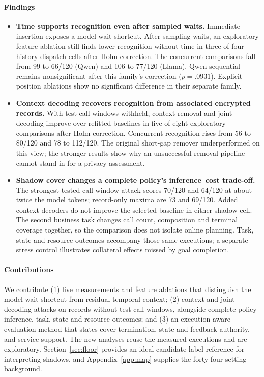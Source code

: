 \paragraph{Findings}
\begin{itemize}
\item \textbf{Time supports recognition even after sampled waits.} Immediate insertion exposes a model-wait shortcut. After sampling waits, an exploratory feature ablation still finds lower recognition without time in three of four history-dispatch cells after Holm correction. The concurrent comparisons fall from 99 to 66/120 (Qwen) and 106 to 77/120 (Llama). Qwen sequential remains nonsignificant after this family's correction ($p=.0931$). Explicit-position ablations show no significant difference in their separate family.
\item \textbf{Context decoding recovers recognition from associated encrypted records.} With test call windows withheld, context removal and joint decoding improve over refitted baselines in five of eight exploratory comparisons after Holm correction. Concurrent recognition rises from 56 to 80/120 and 78 to 112/120. The original short-gap remover underperformed on this view; the stronger results show why an unsuccessful removal pipeline cannot stand in for a privacy assessment.
\item \textbf{Shadow cover changes a complete policy's inference--cost trade-off.} The strongest tested call-window attack scores 70/120 and 64/120 at about twice the model tokens; record-only maxima are 73 and 69/120. Added context decoders do not improve the selected baseline in either shadow cell. The second business task changes call count, composition and terminal coverage together, so the comparison does not isolate online planning. Task, state and resource outcomes accompany those same executions; a separate stress control illustrates collateral effects missed by goal completion.
\end{itemize}

\paragraph{Contributions}
We contribute (1) live measurements and feature ablations that distinguish the model-wait shortcut from residual temporal context; (2) context and joint-decoding attacks on records without test call windows, alongside complete-policy inference, task, state and resource outcomes; and (3) an execution-aware evaluation method that states cover termination, state and feedback authority, and service support. The new analyses reuse the measured executions and are exploratory. Section~\ref{sec:floor} provides an ideal candidate-label reference for interpreting shadows, and Appendix~\ref{app:map} supplies the forty-four-setting background.
